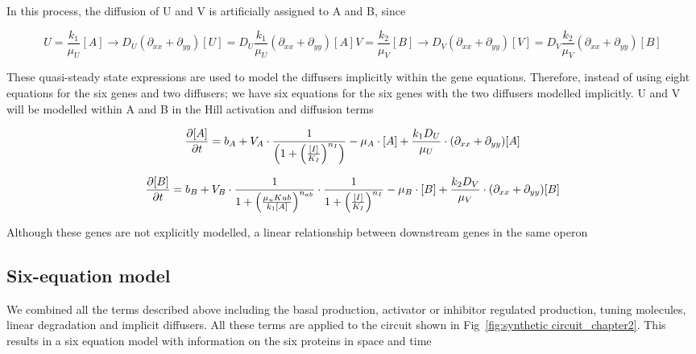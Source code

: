 In this process, the diffusion of U and V is artificially assigned to A and B, since

\begin{subequations}\label{[diffuser_artificial]}

\begin{equation}
    U = \frac{k_{1}}{\mu_{U}}[A] \longrightarrow D_{U} (\partial_{xx} + \partial_{yy})[U] = D_{U}\frac{k_{1}}{\mu_{U}}  (\partial_{xx} + \partial_{yy}) [A]\label{eq:equation2}
\end{equation}

\begin{equation}
    V = \frac{k_{2}}{\mu_{V}}[B] \longrightarrow D_{V} (\partial_{xx} + \partial_{yy})[V] =  D_{V}\frac{k_{2}}{\mu_{V}}  (\partial_{xx} + \partial_{yy}) [B]\label{eq:equation}
\end{equation}

\end{subequations}

These quasi-steady state expressions are used to model the diffusers implicitly within the gene equations.
Therefore, instead of using eight equations for the six genes and two diffusers; we have six equations for the six genes with the two diffusers modelled implicitly.
U and V will be modelled within A and B in the Hill activation and diffusion terms

\begin{equation}
    \pdv{[A]}{t} = b_{A}+V_{A}\cdot \frac{1}{\left(1+\left(\frac{[I]}{K_{I}}\right)^{n_{I}}\right)}-\mu_{A}\cdot[A] + \frac{k_{1}D_{U}}{\mu_{U}}\cdot (\partial_{xx} + \partial_{yy})[A]
\end{equation}

\begin{equation}
    \pdv{[B]}{t} = b_{B}+V_{B}\cdot\frac{1}{1+\left(\frac{\mu_{u}K{ub}}{k_{1}[A]}\right)^{n_{ab}}}\cdot\frac{1}{1+\left(\frac{[I]}{K_{I}}\right)^{n_{I}}}-\mu_{B}\cdot[B] + \frac{k_{2}D_{V}}{\mu_{V}}\cdot (\partial_{xx} + \partial_{yy})[B]
\end{equation}

Although these genes are not explicitly modelled, a linear relationship between downstream genes in the same operon
\subsection{Six-equation model}
We combined all the terms described above including the basal production, activator or inhibitor regulated production, tuning molecules, linear degradation and implicit diffusers.
All these terms are applied to the circuit shown in Fig~\ref{fig:synthetic circuit_chapter2}.
This results in a six equation model with information on the six proteins in space and time

